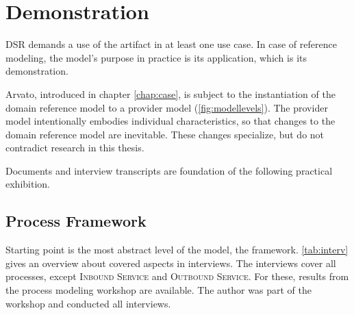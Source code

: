 
\chapter{Demonstration}
\label{chap:demo}

\acrshort{DSR} demands a use of the artifact in at least one use case. In case of reference modeling, the model's purpose in practice is its application, which is its demonstration. 

Arvato, introduced in chapter \ref{chap:case}, is subject to the instantiation of the domain reference model to a provider model (\cf \Fig \ref{fig:modellevels}). The provider model intentionally embodies individual characteristics, so that changes to the domain reference model are inevitable. These changes specialize, but do not contradict research in this thesis. 

Documents and interview transcripts are foundation of the following practical exhibition. 



	\section{Process Framework}
	
	Starting point is the most abstract level of the model, \ie the framework.
	 \Tab \ref{tab:interv} gives an overview about covered aspects in interviews. The interviews cover all processes, except \textsc{Inbound Service} and \textsc{Outbound Service}. For these, results from the process modeling workshop are available. The author was part of the workshop and conducted all interviews. 

